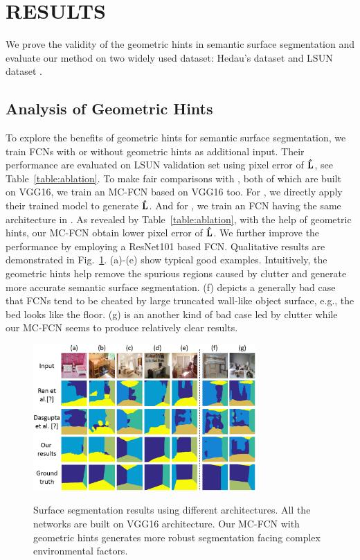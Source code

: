 \section{RESULTS}
\label{sec:Res}

We prove the validity of the geometric hints in semantic surface segmentation and evaluate our method on two widely used dataset: Hedau's dataset \cite{hedau2009recovering} and LSUN dataset \cite{zhang2015large}. 

\subsection{Analysis of Geometric Hints}
\label{sec:ablation}
To explore the benefits of geometric hints for semantic surface segmentation, we train FCNs with or without geometric hints as additional input. Their performance are evaluated on LSUN validation set using pixel error of $\mathbf{\hat{L}}$, see Table~\ref{table:ablation}. To make fair comparisons with \cite{ren2016coarse, dasgupta2016delay}, both of which are built on VGG16, we train an MC-FCN based on VGG16 too. For \cite{ren2016coarse}, we directly apply their trained model to generate $\mathbf{\hat{L}}$. And for \cite{dasgupta2016delay}, we train an FCN having the same architecture in \cite{dasgupta2016delay}. As revealed by Table~\ref{table:ablation}, with the help of geometric hints, our MC-FCN obtain lower pixel error of $\mathbf{\hat{L}}$. We further improve the performance by employing a ResNet101 based FCN. Qualitative results are demonstrated in Fig.~\ref{fig:fcn-comparison}. (a)-(e) show typical good examples. Intuitively, the geometric hints help remove the spurious regions caused by clutter and generate more accurate semantic surface segmentation. (f) depicts a generally bad case that FCNs tend to be cheated by large truncated wall-like object surface, e.g., the bed looks like the floor. (g) is an another kind of bad case led by clutter while our MC-FCN seems to produce relatively clear results.  

\begin{figure}[!ht]
	\centering 
	\textsc{\includegraphics[width=8.5cm]{figure/compare1.png}}
	\caption{Surface segmentation results using different architectures. All the networks are built on VGG16 architecture. Our MC-FCN with geometric hints generates more robust segmentation facing complex environmental factors.}
	\label{fig:fcn-comparison}
\end{figure}

